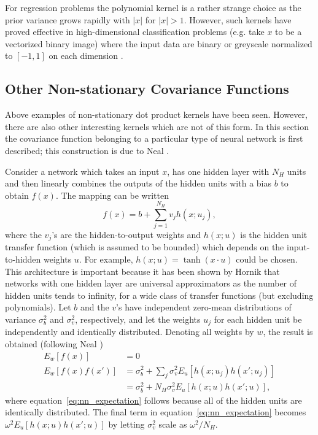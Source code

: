 \documentclass[11pt]{book}
\begin{document}
For regression problems the polynomial kernel is a rather strange choice as the prior variance grows rapidly with $|x|$ for $|x| > 1$. However, such kernels have proved effective in high-dimensional classification problems (e.g. take $x$ to be a vectorized binary image) where the input data are binary or greyscale normalized to $[-1, 1]$ on each dimension \cite{scholkopf2002}.

\subsection{Other Non-stationary Covariance Functions}
\label{sec:nonstationary}

Above examples of non-stationary dot product kernels have been seen. However, there are also other interesting kernels which are not of this form. In this section the covariance function belonging to a particular type of neural network is first described; this construction is due to Neal \cite{neal1996}.

Consider a network which takes an input $x$, has one hidden layer with $N_H$ units and then linearly combines the outputs of the hidden units with a bias $b$ to obtain $f(x)$. The mapping can be written
\begin{equation}
\label{eq:neural_network}
f(x) = b + \sum_{j=1}^{N_H} v_j h(x; u_j),
\end{equation}
where the $v_j$'s are the hidden-to-output weights and $h(x; u)$ is the hidden unit transfer function (which is assumed to be bounded) which depends on the input-to-hidden weights $u$. For example, $h(x; u) = \tanh(x \cdot u)$ could be chosen. This architecture is important because it has been shown by Hornik \cite{hornik1993} that networks with one hidden layer are universal approximators as the number of hidden units tends to infinity, for a wide class of transfer functions (but excluding polynomials). Let $b$ and the $v$'s have independent zero-mean distributions of variance $\sigma_b^2$ and $\sigma_v^2$, respectively, and let the weights $u_j$ for each hidden unit be independently and identically distributed. Denoting all weights by $w$, the result is obtained (following Neal \cite{neal1996})
\begin{align}
\label{eq:nn_expectation}
E_w[f(x)] &= 0 \\
E_w[f(x)f(x')] &= \sigma_b^2 + \sum_j \sigma_v^2 E_u[h(x; u_j) h(x'; u_j)] \nonumber \\
&= \sigma_b^2 + N_H \sigma_v^2 E_u[h(x; u) h(x'; u)], \nonumber
\end{align}
where equation~\eqref{eq:nn_expectation} follows because all of the hidden units are identically distributed. The final term in equation~\eqref{eq:nn_expectation} becomes $\omega^2 E_u[h(x; u) h(x'; u)]$ by letting $\sigma_v^2$ scale as $\omega^2/N_H$.
\end{document}
